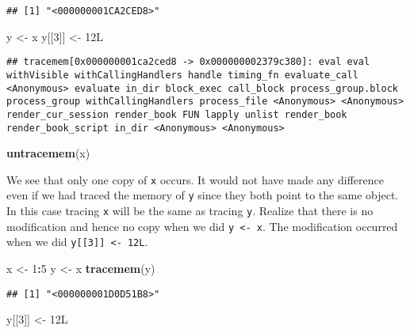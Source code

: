 \documentclass[]{book}
\newenvironment{Shaded}{\begin{snugshade}}{\end{snugshade}}
\newcommand{\DecValTok}[1]{\textcolor[rgb]{0.00,0.00,0.81}{#1}}
\newcommand{\KeywordTok}[1]{\textcolor[rgb]{0.13,0.29,0.53}{\textbf{#1}}}
\newcommand{\NormalTok}[1]{#1}
\newcommand{\OperatorTok}[1]{\textcolor[rgb]{0.81,0.36,0.00}{\textbf{#1}}}
\newcommand{\StringTok}[1]{\textcolor[rgb]{0.31,0.60,0.02}{#1}}
\begin{document}
\begin{verbatim}
## [1] "<000000001CA2CED8>"
\end{verbatim}

\begin{Shaded}
\begin{Highlighting}[]
\NormalTok{y <-}\StringTok{ }\NormalTok{x}
\NormalTok{y[[}\DecValTok{3}\NormalTok{]] <-}\StringTok{ }\NormalTok{12L}
\end{Highlighting}
\end{Shaded}

\begin{verbatim}
## tracemem[0x000000001ca2ced8 -> 0x000000002379c380]: eval eval withVisible withCallingHandlers handle timing_fn evaluate_call <Anonymous> evaluate in_dir block_exec call_block process_group.block process_group withCallingHandlers process_file <Anonymous> <Anonymous> render_cur_session render_book FUN lapply unlist render_book render_book_script in_dir <Anonymous> <Anonymous>
\end{verbatim}

\begin{Shaded}
\begin{Highlighting}[]
\KeywordTok{untracemem}\NormalTok{(x)}
\end{Highlighting}
\end{Shaded}

We see that only one copy of \texttt{x} occurs. It would not have made any difference even if we had traced the memory of \texttt{y} since they both point to the same object. In this case tracing \texttt{x} will be the same as tracing \texttt{y}. Realize that there is no modification and hence no copy when we did \texttt{y\ \textless{}-\ x}. The modification occurred when we did \texttt{y{[}{[}3{]}{]}\ \textless{}-\ 12L}.

\begin{Shaded}
\begin{Highlighting}[]
\NormalTok{x <-}\StringTok{ }\DecValTok{1}\OperatorTok{:}\DecValTok{5}
\NormalTok{y <-}\StringTok{ }\NormalTok{x}
\KeywordTok{tracemem}\NormalTok{(y)}
\end{Highlighting}
\end{Shaded}

\begin{verbatim}
## [1] "<000000001D0D51B8>"
\end{verbatim}

\begin{Shaded}
\begin{Highlighting}[]
\NormalTok{y[[}\DecValTok{3}\NormalTok{]] <-}\StringTok{ }\NormalTok{12L}
\end{Highlighting}
\end{Shaded}
\end{document}
